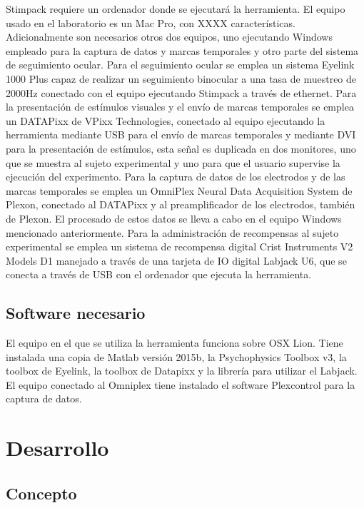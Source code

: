 \documentclass[conference]{IEEEtran}
\begin{document}
Stimpack requiere un ordenador donde se ejecutará la herramienta. El equipo usado en el laboratorio es un Mac Pro, con XXXX características.
Adicionalmente son necesarios otros dos equipos, uno ejecutando Windows empleado para la captura de datos y marcas temporales y otro parte del sistema de seguimiento ocular.
Para el seguimiento ocular se emplea un sistema Eyelink 1000 Plus\cite{eyelink} capaz de realizar un seguimiento binocular a una tasa de muestreo de 2000Hz conectado con el equipo ejecutando Stimpack a través de ethernet.
Para la presentación de estímulos visuales y el envío de marcas temporales se emplea un DATAPixx \cite{datapixx} de VPixx Technologies, conectado al equipo ejecutando la herramienta mediante USB para el envío de marcas temporales y mediante DVI para la presentación de estímulos, esta señal es duplicada en dos monitores, uno que se muestra al sujeto experimental y uno para que el usuario supervise la ejecución del experimento.
Para la captura de datos de los electrodos y de las marcas temporales se emplea un OmniPlex Neural Data Acquisition System\cite{omniplex} de Plexon, conectado al DATAPixx y al preamplificador de los electrodos, también de Plexon. El procesado de estos datos se lleva a cabo en el equipo Windows mencionado anteriormente.
Para la administración de recompensas al sujeto experimental se emplea un sistema de recompensa digital Crist Instruments V2 Models D1 manejado a través de una  tarjeta de IO digital Labjack U6\cite{labjack}, que se conecta a través de USB con el ordenador que ejecuta la herramienta.


\subsection{Software necesario}
El equipo en el que se utiliza la herramienta funciona sobre OSX Lion. Tiene instalada una copia de Matlab versión 2015b, la Psychophysics Toolbox v3, la toolbox de Eyelink, la toolbox de Datapixx y la librería para utilizar el Labjack.
El equipo conectado al Omniplex tiene instalado el software Plexcontrol\cite{plexcontrol} para la captura de datos.

\section{Desarrollo}
\subsection{Concepto}
 
\end{document}
